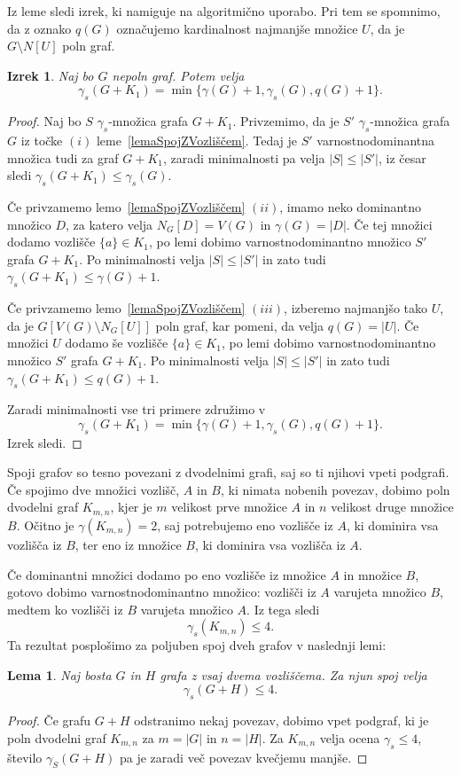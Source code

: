 \documentclass[12pt,a4paper,twoside]{article}
\theoremstyle{definition} %
\theoremstyle{plain} %
\newtheorem{lema}[definicija]{Lema}
\newtheorem{izrek}[definicija]{Izrek}
\numberwithin{equation}{section}  %
\begin{document}
Iz leme sledi izrek, ki namiguje na algoritmično uporabo. Pri tem se spomnimo, da z oznako $q(G)$ označujemo kardinalnost najmanjše množice $U$, da je $G \setminus N[U]$ poln graf.
\begin{izrek}\label{theorem3.5}{\rm{\cite[Corollary 2.10]{castillano2014secure}}}
Naj bo $G$ nepoln graf. Potem velja $$\gamma_s(G + K_1) = \min\{\gamma(G) + 1, \gamma_s(G), q(G) + 1\}.$$
\end{izrek}
\begin{proof}
Naj bo $S$ $\gamma_s$-množica grafa $G + K_1$. Privzemimo, da je $S'$ $\gamma_s$-množica grafa $G$ iz točke $(i)$ leme~\ref{lemaSpojZVozliščem}. Tedaj je $S'$ varnostnodominantna množica tudi za graf $G + K_1$, zaradi minimalnosti pa velja $|S| \leq |S'|$, iz česar sledi $\gamma_s(G + K_1) \leq \gamma_s(G)$. 

Če privzamemo lemo~\ref{lemaSpojZVozliščem} $(ii)$, imamo neko dominantno množico $D$, za katero velja $N_G[D] = V(G)$ in $\gamma(G) = |D|$. Če tej množici dodamo vozlišče $\{a\} \in K_1$, po lemi dobimo varnostnodominantno množico $S'$ grafa $G + K_1$. Po minimalnosti velja $|S| \leq |S'|$ in zato tudi $\gamma_s(G + K_1) \leq \gamma(G) + 1$.

Če privzamemo lemo~\ref{lemaSpojZVozliščem} $(iii)$, izberemo najmanjšo tako $U$, da je $G[V(G) \setminus N_G[U]]$ poln graf, kar pomeni, da velja $q(G) = |U|$. Če množici $U$ dodamo še vozlišče $\{a\} \in K_1$, po lemi dobimo varnostnodominantno množico $S'$ grafa $G + K_1$. Po minimalnosti velja $|S| \leq |S'|$ in zato tudi $\gamma_s(G + K_1) \leq q(G) + 1$.

\medskip
Zaradi minimalnosti vse tri primere združimo v $$\gamma_s(G + K_1) = \min\{\gamma(G) + 1, \gamma_s(G), q(G) + 1\}.$$
Izrek sledi.\end{proof}

Spoji grafov so tesno povezani z dvodelnimi grafi, saj so ti njihovi vpeti podgrafi. Če spojimo dve množici vozlišč, $A$ in $B$, ki nimata nobenih povezav, dobimo poln dvodelni graf $K_{m,n}$, kjer je $m$ velikost prve množice $A$ in $n$ velikost druge množice $B$. Očitno je $\gamma(K_{m,n}) = 2$, saj potrebujemo eno vozlišče iz $A$, ki dominira vsa vozlišča iz $B$, ter eno iz množice $B$, ki dominira vsa vozlišča iz $A$.


Če dominantni množici dodamo po eno vozlišče iz množice $A$ in množice $B$, gotovo dobimo varnostnodominantno množico: vozlišči iz $A$ varujeta množico $B$, medtem ko vozlišči iz $B$ varujeta množico $A$. Iz tega sledi
$$\gamma_s(K_{m,n}) \leq 4.$$
Ta rezultat posplošimo za poljuben spoj dveh grafov v naslednji lemi:
\begin{lema} \label{lemma3.6}
Naj bosta $G$ in $H$ grafa z vsaj dvema vozliščema. Za njun spoj velja $$\gamma_s(G + H) \leq 4.$$
\end{lema}
\begin{proof}
Če grafu $G + H$ odstranimo nekaj povezav, dobimo vpet podgraf, ki je poln dvodelni graf $K_{m,n}$ za $m = |G|$ in $n = |H|$. Za $K_{m,n}$ velja ocena $\gamma_s \leq 4$, število $\gamma_S(G + H)$ pa je zaradi več povezav kvečjemu manjše.\end{proof}
\end{document}
